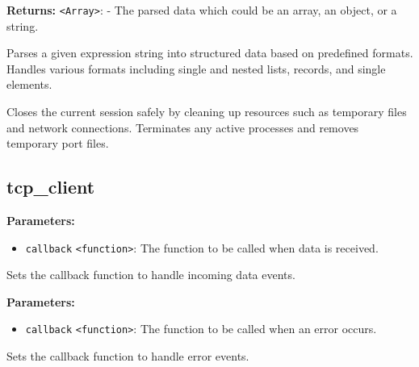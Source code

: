 \documentclass[12pt,a4paper]{article}
\begin{document}
\noindent \textbf{Returns:} \texttt{<Array>}: - The parsed data which could be an array, an object, or a string.

\noindent Parses a given expression string into structured data based on predefined formats.
Handles various formats including single and nested lists, records, and single elements.

\vspace{5mm}
\noindent {}


\noindent Closes the current session safely by cleaning up resources such as temporary files and network connections.
Terminates any active processes and removes temporary port files.


\subsection{tcp\_client}
\vspace{5mm}
\noindent {}


\noindent \textbf{Parameters:}
\begin{itemize}
  \item \texttt{callback} \texttt{<function>}: The function to be called when data is received.
\end{itemize}

\noindent Sets the callback function to handle incoming data events.

\vspace{5mm}
\noindent {}


\noindent \textbf{Parameters:}
\begin{itemize}
  \item \texttt{callback} \texttt{<function>}: The function to be called when an error occurs.
\end{itemize}

\noindent Sets the callback function to handle error events.

\vspace{5mm}
\noindent {}
\end{document}
